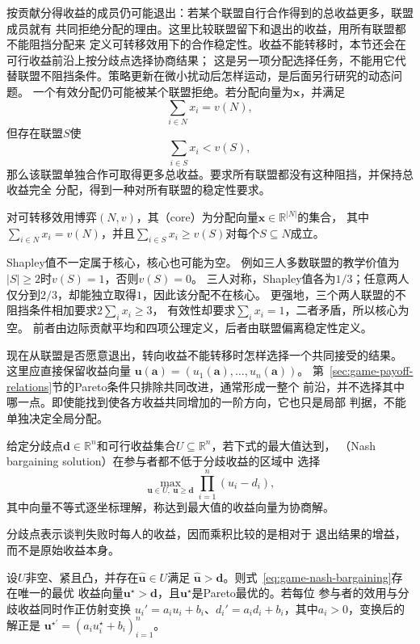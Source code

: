 按贡献分得收益的成员仍可能退出：若某个联盟自行合作得到的总收益更多，联盟成员就有
共同拒绝分配的理由。这里比较联盟留下和退出的收益，用所有联盟都不能阻挡分配来
定义可转移效用下的合作稳定性。收益不能转移时，本节还会在可行收益前沿上按分歧点选择协商结果；
这是另一项分配选择任务，不能用它代替联盟不阻挡条件。策略更新在微小扰动后怎样运动，是后面另行研究的动态问题。
一个有效分配仍可能被某个联盟拒绝。若分配向量为\(\bm{x}\)，并满足
\[
  \sum_{i\in N}x_i=v(N),
\]
但存在联盟\(S\)使
\[
  \sum_{i\in S}x_i<v(S),
\]
那么该联盟单独合作可取得更多总收益。要求所有联盟都没有这种阻挡，并保持总收益完全
分配，得到一种对所有联盟的稳定性要求。
\begin{definition}[合作博弈的核心]
\label{def:game-cooperative-core}
对可转移效用博弈$(N,v)$，其（core）为分配向量$\bm x\in\mathbb R^{|N|}$的集合，
其中$\sum_{i\in N}x_i=v(N)$，并且$\sum_{i\in S}x_i\geq v(S)$对每个$S\subseteq N$成立。
\end{definition}
Shapley值不一定属于核心，核心也可能为空。
例如三人多数联盟的教学价值为$|S|\geq2$时$v(S)=1$，否则$v(S)=0$。
三人对称，Shapley值各为$1/3$；任意两人仅分到$2/3$，却能独立取得$1$，因此该分配不在核心。
更强地，三个两人联盟的不阻挡条件相加要求$2\sum_i x_i\geq3$，
有效性却要求$\sum_i x_i=1$，二者矛盾，所以核心为空。
前者由边际贡献平均和四项公理定义，后者由联盟偏离稳定性定义。

现在从联盟是否愿意退出，转向收益不能转移时怎样选择一个共同接受的结果。
这里应直接保留收益向量
\(\bm{u}(\bm{a})=(u_1(\bm{a}),\ldots,u_n(\bm{a}))\)。
第~\ref{sec:game-payoff-relations}节的Pareto条件只排除共同改进，通常形成一整个
前沿，并不选择其中哪一点。即使能找到使各方收益共同增加的一阶方向，它也只是局部
判据，不能单独决定全局分配。

\begin{definition}[Nash乘积协商解]
\label{def:game-nash-bargaining-solution}
给定分歧点\(\bm{d}\in\mathbb R^n\)和可行收益集合\(U\subseteq\mathbb{R}^n\)，若下式的最大值达到，
（Nash bargaining solution）在参与者都不低于分歧收益的区域中
选择
\begin{equation}
  \max_{\bm{u}\in U,\ \bm{u}\geq\bm{d}}
  \prod_{i=1}^{n}(u_i-d_i),
  \label{eq:game-nash-bargaining}
\end{equation}
其中向量不等式逐坐标理解，称达到最大值的收益向量为协商解。
\end{definition}
分歧点表示谈判失败时每人的收益，因而乘积比较的是相对于
退出结果的增益，而不是原始收益本身。

\begin{theorem}
\label{thm:game-nash-bargaining-properties}
设\(U\)非空、紧且凸，并存在\(\widehat{\bm{u}}\in U\)满足
\(\widehat{\bm{u}}>\bm{d}\)。则式~\eqref{eq:game-nash-bargaining}存在唯一的最优
收益向量\(\bm{u}^\star>\bm{d}\)，且\(\bm{u}^\star\)是Pareto最优的。若每位
参与者的效用与分歧收益同时作正仿射变换
\(u_i'=a_i u_i+b_i\)、\(d_i'=a_i d_i+b_i\)，其中\(a_i>0\)，变换后的解正是
\(\bm{u}^{\star\prime}=(a_i u_i^\star+b_i)_{i=1}^n\)。
\end{theorem}

